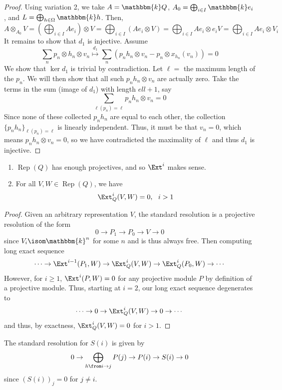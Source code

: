\documentclass[11pt,leqno,oneside]{amsbook}
\numberwithin{thm}{section}
\newcommand{\bbk}{\mathbbm{k}} %
\newcommand{\Rep}{\operatorname{Rep}} %
\renewcommand{\Q}{Q} %
\begin{document}
\begin{proof}
  Using variation 2, we take \(A = \bbk Q\), \(A_0 = \bigoplus_{i \in
    I} \bbk e_i\), and \(L = \bigoplus_{h \in \Omega} \bbk
  h\). Then, \[
    A \otimes_{A_0} V = (\bigoplus_{i \in I} A e_i) \otimes V =
    \bigoplus_{i \in I} (A e_i \otimes V) = \bigoplus_{i \in I} A e_i
    \otimes e_i V = \bigoplus_{i \in I} A e_i \otimes V_i
  \]
  It remains to show that \(d_1\) is injective. Assume \[
    \sum_n p_n \otimes h_n \otimes v_n \overset{d_1}{\mapsto} \sum_n
    (p_n h_n \otimes v_n - p_n \otimes x_{h_n}(v_n)) = 0
  \]
  We show that \(\ker d_1\) is trivial by
  contradiction. Let \(\ell = \) the maximum length of the \(p_n\). We
  will then show that all such \(p_n h_n \otimes v_n\) are actually
  zero. Take the terms in the sum (image of \(d_1\)) with length
  \(ell+1\), say \[
    \sum_{\ell(p_n) = \ell} p_n h_n \otimes v_n = 0
  \]
  Since none of these collected \(p_n h_n\) are equal to each other,
  the collection \(\{p_n h_n\}_{\ell(p_n) = \ell}\) is linearly
  independent. Thus, it must be that \(v_n = 0\), which means \(p_n
  h_n \otimes v_n = 0\), so we have contradicted the maximality of
  \(\ell\) and thus \(d_1\) is injective. 
\end{proof}
\begin{cor}
  \begin{enumerate}
  \item   \(\Rep(\Q)\) has enough projectives, and so \(\Ext^i\) makes
    sense.
  \item For all \(V,W \in \Rep(\Q)\), we have \[
      \Ext^i_\Q(V,W) = 0, \ \ i > 1
    \]
  \end{enumerate}
\end{cor}
\begin{proof}
  Given an arbitrary representation \(V\),  the standard
  resolution is a projective resolution of the
  form \[
    0 \to P_1 \to P_0 \to V \to 0
  \]
   since \(V_i \isom \bbk^n\) for some \(n\) and is thus always free.
   Then computing long exact sequence \[ 
    \cdots \to \Ext^{i-1}(P_1,W) \to \Ext^i_Q(V,W) \to \Ext^i_Q(P_0,W) \to \cdots
  \]
  However, for \(i \geq 1\), \(\Ext^i(P,W) = 0\) for any projective
  module \(P\) by definition of a projective module. Thus, starting at
  \(i=2\), our long
  exact sequence degenerates to \[
    \cdots \to 0 \to \Ext^i_Q(V,W) \to 0 \to \cdots
  \]
  and thus, by exactness, \(\Ext^i_Q(V,W) = 0\) for \(i > 1\).
\end{proof}
\begin{example}
  The standard resolution for \(S(i)\) is given by \[
    0 \to \bigoplus_{h \from i \to j} P(j) \to P(i) \to S(i) \to 0
  \]
  since \((S(i))_j = 0\) for \(j \neq i\).
\end{example}
\end{document}
